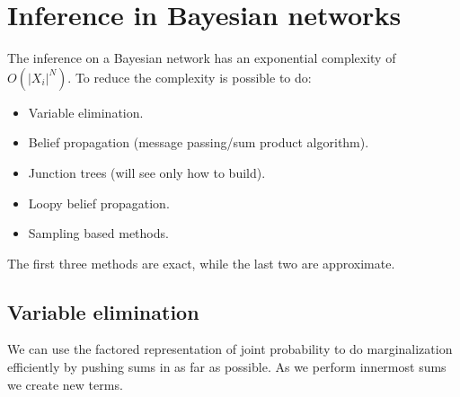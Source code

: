 \documentclass[12pt, a4paper]{report}
\begin{document}
    \section{Inference in Bayesian networks}
    The inference on a Bayesian network has an exponential complexity of $O(\left\lvert X_i \right\rvert^N)$. To reduce the complexity is possible to do: 
    \begin{itemize}
        \item Variable elimination.
        \item Belief propagation (message passing/sum product algorithm).
        \item Junction trees (will see only how to build).
        \item Loopy belief propagation.
        \item Sampling based methods.
    \end{itemize}
    The first three methods are exact, while the last two are approximate. 

    \subsection{Variable elimination}
    We can use the factored representation of joint probability to do marginalization efficiently by pushing sums in as far as possible. As we perform innermost 
    sums we create new terms.
\end{document}
